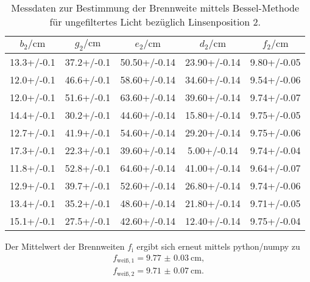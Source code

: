 \begin{table}
  \caption{Messdaten zur Bestimmung der Brennweite mittels Bessel-Methode für ungefiltertes Licht bezüglich Linsenposition 2.}
  \label{tab:bessii}
  \centering
\begin{tabular}{ccccc}
  \toprule
$b_\mathrm{2}/\si{\centi\meter}$ & $g_\mathrm{2}/\si{\centi\meter}$ & $e_\mathrm{2}/\si{\centi\meter}$ & $d_\mathrm{2}/\si{\centi\meter}$ & $f_\mathrm{2}/\si{\centi\meter}$ \\
\midrule
13.3+/-0.1 & 37.2+/-0.1 & 50.50+/-0.14 & 23.90+/-0.14 & 9.80+/-0.05 \\
12.0+/-0.1 & 46.6+/-0.1 & 58.60+/-0.14 & 34.60+/-0.14 & 9.54+/-0.06 \\
12.0+/-0.1 & 51.6+/-0.1 & 63.60+/-0.14 & 39.60+/-0.14 & 9.74+/-0.07 \\
14.4+/-0.1 & 30.2+/-0.1 & 44.60+/-0.14 & 15.80+/-0.14 & 9.75+/-0.05 \\
12.7+/-0.1 & 41.9+/-0.1 & 54.60+/-0.14 & 29.20+/-0.14 & 9.75+/-0.06 \\
17.3+/-0.1 & 22.3+/-0.1 & 39.60+/-0.14 & 5.00+/-0.14 & 9.74+/-0.04 \\
11.8+/-0.1 & 52.8+/-0.1 & 64.60+/-0.14 & 41.00+/-0.14 & 9.64+/-0.07 \\
12.9+/-0.1 & 39.7+/-0.1 & 52.60+/-0.14 & 26.80+/-0.14 & 9.74+/-0.06 \\
13.4+/-0.1 & 35.2+/-0.1 & 48.60+/-0.14 & 21.80+/-0.14 & 9.71+/-0.05 \\
15.1+/-0.1 & 27.5+/-0.1 & 42.60+/-0.14 & 12.40+/-0.14 & 9.75+/-0.04 \\
\bottomrule
\end{tabular}
\end{table}
Der Mittelwert der Brennweiten $f_\mathrm{i}$ ergibt sich erneut mittels python/numpy \cite{numpy} zu
\begin{gather*}
  f_\mathrm{weiß, 1}= \SI{9.77(3)}{\centi\meter}\text{,}\\
  f_\mathrm{weiß, 2}= \SI{9.71(7)}{\centi\meter}\text{.}
\end{gather*}
\FloatBarrier
